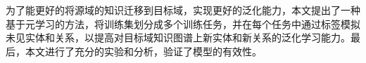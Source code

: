 为了能更好的将源域的知识迁移到目标域，实现更好的泛化能力，本文提出了一种基于元学习的方法，将训练集划分成多个训练任务，并在每个任务中通过标签模拟未见实体和关系，以提高对目标域知识图谱上新实体和新关系的泛化学习能力。最后，本文进行了充分的实验和分析，验证了模型的有效性。






